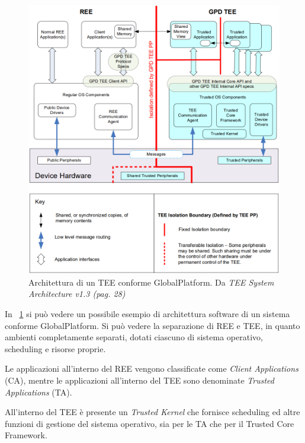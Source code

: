 \documentclass[12pt,italian]{report}
\begin{document}
 	\begin{figure}
 		\centering
 		\includegraphics[width=1\textwidth]{immagini/TEE_SW_Architecture}
 		\caption{
 			Architettura di un TEE conforme GlobalPlatform. 
 			Da \textit{TEE System Architecture v1.3 (pag. 28)}
 			\cite{gp2020systemarchitecture}
 		}
 		\label{fig:tee-architecture}
 	\end{figure}
 	
 	\bigbreak
 	
 	In \figurename~\ref{fig:tee-architecture} si può vedere un possibile esempio di architettura software di un sistema conforme GlobalPlatform. Si può vedere la separazione di REE e TEE, in quanto ambienti completamente separati, dotati ciascuno di sistema operativo, scheduling e risorse proprie.
 	
 	Le applicazioni all'interno del REE vengono classificate come \textit{Client Applications} (CA), mentre le applicazioni all'interno del TEE sono denominate \textit{Trusted Applications} (TA).
 	
 	All'interno del TEE è presente un \textit{Trusted Kernel} che fornisce scheduling ed altre funzioni di gestione del sistema operativo, sia per le TA che per il Trusted Core Framework.
 	
 	\bigbreak
 	
\end{document}
